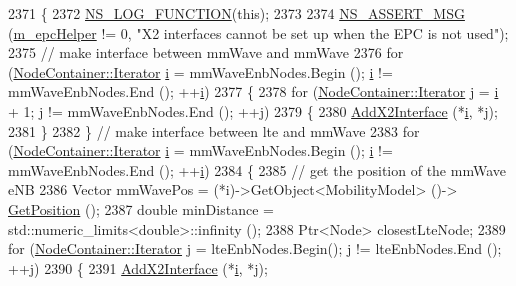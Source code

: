 \begin{DoxyCode}
2371 \{
2372         \hyperlink{log-macros-disabled_8h_a90b90d5bad1f39cb1b64923ea94c0761}{NS\_LOG\_FUNCTION}(\textcolor{keyword}{this});
2373 
2374         \hyperlink{assert_8h_aff5ece9066c74e681e74999856f08539}{NS\_ASSERT\_MSG} (\hyperlink{classns3_1_1MmWaveHelper_a03b33f9a2480a4cdd8ffe697ccc08e9e}{m\_epcHelper} != 0, \textcolor{stringliteral}{"X2 interfaces cannot be set up when the
       EPC is not used"});
2375    \textcolor{comment}{// make interface between mmWave and mmWave}
2376         \textcolor{keywordflow}{for} (\hyperlink{classns3_1_1NodeContainer_aa1a9f2d2b09bfef7d066d3974bca2cc4}{NodeContainer::Iterator} \hyperlink{bernuolliDistribution_8m_a6f6ccfcf58b31cb6412107d9d5281426}{i} = mmWaveEnbNodes.Begin (); 
      \hyperlink{bernuolliDistribution_8m_a6f6ccfcf58b31cb6412107d9d5281426}{i} != mmWaveEnbNodes.End (); ++\hyperlink{bernuolliDistribution_8m_a6f6ccfcf58b31cb6412107d9d5281426}{i})
2377     \{
2378       \textcolor{keywordflow}{for} (\hyperlink{classns3_1_1NodeContainer_aa1a9f2d2b09bfef7d066d3974bca2cc4}{NodeContainer::Iterator} j = \hyperlink{bernuolliDistribution_8m_a6f6ccfcf58b31cb6412107d9d5281426}{i} + 1; j != mmWaveEnbNodes.End (); ++j)
2379         \{
2380           \hyperlink{classns3_1_1MmWaveHelper_a879c5e60c46b04b9decd31624b91cc70}{AddX2Interface} (*\hyperlink{bernuolliDistribution_8m_a6f6ccfcf58b31cb6412107d9d5281426}{i}, *j);
2381         \}
2382     \} \textcolor{comment}{// make interface between lte and mmWave}
2383     \textcolor{keywordflow}{for} (\hyperlink{classns3_1_1NodeContainer_aa1a9f2d2b09bfef7d066d3974bca2cc4}{NodeContainer::Iterator} \hyperlink{bernuolliDistribution_8m_a6f6ccfcf58b31cb6412107d9d5281426}{i} = mmWaveEnbNodes.Begin (); 
      \hyperlink{bernuolliDistribution_8m_a6f6ccfcf58b31cb6412107d9d5281426}{i} != mmWaveEnbNodes.End (); ++\hyperlink{bernuolliDistribution_8m_a6f6ccfcf58b31cb6412107d9d5281426}{i})
2384     \{
2385         \textcolor{comment}{// get the position of the mmWave eNB}
2386                 Vector mmWavePos = (*i)->GetObject<MobilityModel> ()->
      \hyperlink{lena-cqi-threshold_8cc_acebf763e1a0478cec225f9547941ae54}{GetPosition} ();
2387                 \textcolor{keywordtype}{double} minDistance = std::numeric\_limits<double>::infinity ();
2388                 Ptr<Node> closestLteNode;
2389                 \textcolor{keywordflow}{for} (\hyperlink{classns3_1_1NodeContainer_aa1a9f2d2b09bfef7d066d3974bca2cc4}{NodeContainer::Iterator} j = lteEnbNodes.Begin(); j != 
      lteEnbNodes.End (); ++j)
2390                 \{
2391                         \hyperlink{classns3_1_1MmWaveHelper_a879c5e60c46b04b9decd31624b91cc70}{AddX2Interface} (*\hyperlink{bernuolliDistribution_8m_a6f6ccfcf58b31cb6412107d9d5281426}{i}, *j);

\end{DoxyCode}
